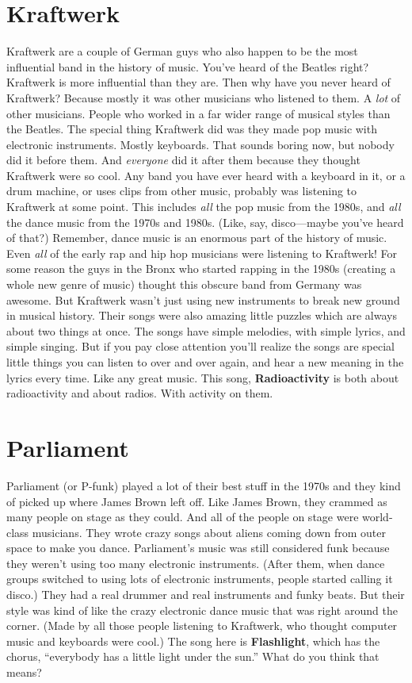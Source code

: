 \documentclass[letterpaper,single]{article}
\begin{document}
\section{Kraftwerk}
Kraftwerk are a couple of German guys who also happen to be the most influential band in the history of music. 
You've heard of the Beatles right? 
Kraftwerk is more influential than they are. 
Then why have you never heard of Kraftwerk? 
Because mostly it was other musicians who listened to them. 
A \emph{lot} of other musicians. 
People who worked in a far wider range of musical styles than the Beatles. 
The special thing Kraftwerk did was they made pop music with electronic instruments. 
Mostly keyboards. 
That sounds boring now, but nobody did it before them. 
And \emph{everyone} did it after them because they thought Kraftwerk were so cool. 
Any band you have ever heard with a keyboard in it, or a drum machine, or uses clips from other music, probably was listening to Kraftwerk at some point. 
This includes \emph{all} the pop music from the 1980s, and \emph{all} the dance music from the 1970s and 1980s. (Like, say, disco---maybe you've heard of that?)
Remember, dance music is an enormous part of the history of music.
Even \emph{all} of the early rap and hip hop musicians were listening to Kraftwerk! 
For some reason the guys in the Bronx who started rapping in the 1980s (creating a whole new genre of music) thought this obscure band from Germany was awesome. 
But Kraftwerk wasn't just using new instruments to break new ground in musical history. 
Their songs were also amazing little puzzles which are always about two things at once. 
The songs have simple melodies, with simple lyrics, and simple singing. 
But if you pay close attention you'll realize the songs are special little things you can listen to over and over again, and hear a new meaning in the lyrics every time. 
Like any great music. 
This song, \textbf{Radioactivity} is both about radioactivity and about radios. With activity on them.

\section{Parliament}
Parliament (or P-funk) played a lot of their best stuff in the 1970s and they kind of picked up where James Brown left off. 
Like James Brown, they crammed as many people on stage as they could. 
And all of the people on stage were world-class musicians. 
They wrote crazy songs about aliens coming down from outer space to make you dance. 
Parliament's music was still considered funk because they weren't using too many electronic instruments. 
(After them, when dance groups switched to using lots of electronic instruments, people started calling it disco.) 
They had a real drummer and real instruments and funky beats.
But their style was kind of like the crazy electronic dance music that was right around the corner. 
(Made by all those people listening to Kraftwerk, who thought computer music and keyboards were cool.)
The song here is \textbf{Flashlight}, which has the chorus, ``everybody has a little light under the sun.'' 
What do you think that means?
\end{document}
